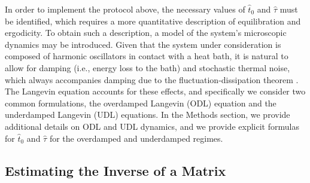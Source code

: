 \documentclass[prx,onecolumn,floatfix,longbibliography,notitlepage, nofootinbib]{revtex4-1}
\begin{document}
In order to implement the protocol above, the necessary values of $\widehat{t}_0$ and $\widehat{\tau}$ must be identified, which requires a more quantitative description of equilibration and ergodicity. To obtain such a description, a model of the system's microscopic dynamics may be introduced. Given that the system under consideration is composed of harmonic oscillators in contact with a heat bath, it is natural to allow for damping (i.e., energy loss to the bath) and stochastic thermal noise, which always accompanies damping due to the fluctuation-dissipation theorem \cite{kubo1966fluctuation, weber1956fluctuation}. The Langevin equation accounts for these effects, and specifically we consider two common formulations, the overdamped Langevin (ODL) equation  and the underdamped Langevin (UDL) equations. In the Methods section, we provide additional details on ODL and UDL dynamics, and we provide explicit formulas for $\widehat{t}_0$ and $\widehat{\tau}$ for the overdamped and underdamped regimes.






\subsection{Estimating the Inverse of a Matrix}
\end{document}
